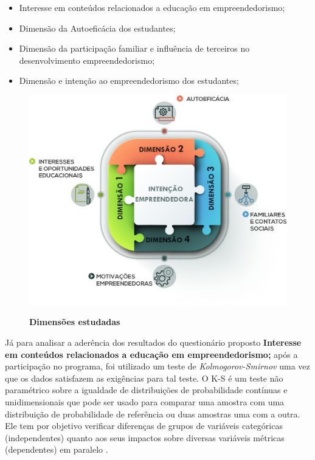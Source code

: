 \begin{itemize}
\item {Interesse em conteúdos relacionados a educação em empreendedorismo;}
\item {Dimensão da Autoeficácia dos estudantes;}
\item {Dimensão da participação familiar e influência de terceiros no desenvolvimento empreendedorismo;}
\item {Dimensão e intenção  ao empreendedorismo dos estudantes;}
\end{itemize}



\begin{figure}[H]
\centering
\caption{\textbf{Dimensões estudadas}}
\includegraphics[scale=0.35]{Imagens/dimencoes.png}
\label{figura_9}
\end{figure}



Já para analisar a aderência dos resultados do questionário proposto \textbf{Interesse em conteúdos relacionados a educação em empreendedorismo;} após a participação no programa, foi utilizado um teste de \textit{Kolmogorov-Smirnov} uma vez que os dados satisfazem as exigências para tal teste. O K-S é um teste não paramétrico sobre a igualdade de distribuições de probabilidade contínuas e unidimensionais que pode ser usado para comparar uma amostra com uma distribuição de probabilidade de referência ou duas amostras uma com a outra. Ele tem por objetivo verificar diferenças de grupos de variáveis categóricas (independentes) quanto aos seus impactos sobre diversas variáveis métricas (dependentes) em paralelo \cite{hair_alise_2009}. 

